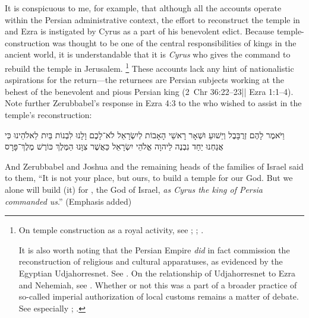 It is conspicuous to me, for example, that although all the accounts operate within the Persian administrative context, the effort to reconstruct the temple in \chronicles and Ezra is instigated by Cyrus as a part of his benevolent edict. Because temple-construction was thought to be one of the central responsibilities of kings in the ancient world, it is understandable that it is \emph{Cyrus} who gives the command to rebuild the temple in Jerusalem.%
    \footnote{On temple construction as a royal activity, see
        \cite{kapelrud_orientalia1963};
        \cite{petersen_cbq1974};
        \cite{laato_zaw1994}.

        It is also worth noting that the Persian Empire \emph{did} in fact commission the reconstruction of religious and cultural apparatuses, as evidenced by the Egyptian Udjahorresnet. See 
            \cite{lloyd_jea1982}. On the relationship of Udjahorresnet to Ezra and Nehemiah, see 
            \cite{blenkinsopp_jbl1987}.
        Whether or not this was a part of a broader practice of so-called imperial authorization of local customs remains a matter of debate. See especially
            \cite{frei_frei1984};
            \cite{frei_watts2001}.}
These accounts lack any hint of nationalistic aspirations for the return---the returnees are Persian subjects working at the behest of the benevolent and pious Persian king (2~Chr 36:22--23|| Ezra 1:1--4). Note further Zerubbabel's response in Ezra 4:3 to the  who wished to assist in the temple's reconstruction:
\begin{hebrewtext}
    וַיֹּאמֶר לָהֶם זְרֻבָּבֶל וְיֵשׁוּעַ וּשְׁאָר רָאשֵׁי הָאָבוֹת לְיִשְׂרָאֵל לֹא־לָכֶם וָלָנוּ לִבְנוֹת בַּיִת לֵאלֹהֵינוּ כִּי אֲנַחְנוּ יַחַד נִבְנֶה לַיהוָה אֱלֹהֵי יִשְׂרָאֵל כַּאֲשֶׁר צִוָּנוּ הַמֶּלֶךְ כּוֹרֶשׁ מֶלֶךְ־פָּרָס
\end{hebrewtext}
\begin{translation}
    And Zerubbabel and Joshua and the remaining heads of the families of Israel said to them, ``It is not your place, but ours, to build a temple for our God. But we alone will build (it) for \yahweh, the God of Israel, \emph{as Cyrus the king of Persia commanded us}.'' (Emphasis added)
\end{translation}
\noindent
